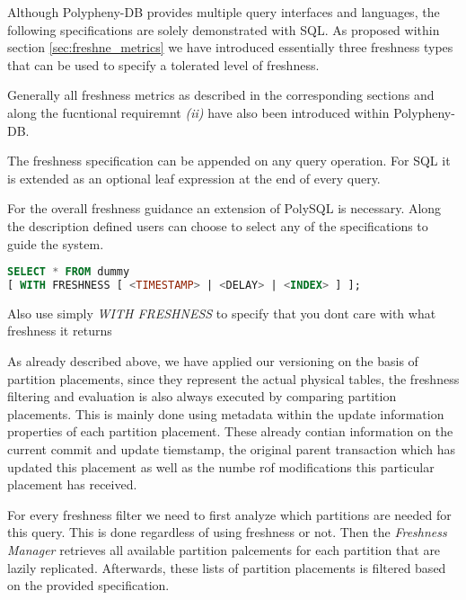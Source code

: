 Although Polypheny-DB provides multiple query interfaces and languages, the following specifications are solely demonstrated with SQL. 
As proposed within section \ref{sec:freshne_metrics} we have introduced essentially three freshness types that can be used to specify a tolerated level of freshness.

Generally all freshness metrics as described in the corresponding sections and along the fucntional requiremnt \textit{(ii)} have also been introduced within Polypheny-DB.

The freshness specification can be appended on any query operation.
For SQL it is extended as an optional leaf expression at the end of every query. 

For the overall freshness guidance an extension of PolySQL is necessary.
Along the description defined users can choose to select any of the specifications to guide the system.
\begin{lstlisting}[language=sql]
SELECT * FROM dummy 
[ WITH FRESHNESS [ <TIMESTAMP> | <DELAY> | <INDEX> ] ];
\end{lstlisting}

Also use simply \emph{WITH FRESHNESS} to specify that you dont care with what freshness it returns


As already described above, we have applied our versioning on the basis of partition placements, since they represent the actual physical tables,
the freshness filtering and evaluation is also always executed by comparing partition placements. 
This is mainly done using metadata within the update information properties of each partition placement. These already contian information on the current commit and update tiemstamp,
the original parent transaction which has updated this placement as well as the numbe rof modifications this particular placement has received.

For every freshness filter we need to first analyze which partitions are needed for this query. This is done regardless of using freshness or not.
Then the \textit{Freshness Manager} retrieves all available partition palcements for each partition that are lazily replicated.
Afterwards, these lists of partition placements is filtered based on the provided specification.



